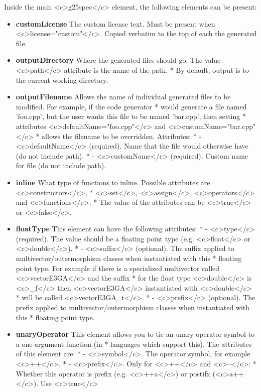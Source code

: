 \documentclass[10pt, a4paper]{article}
\begin{document}
  
Inside the main <c>g25spec</c> element, the following elements can be present:
\begin{itemize}
\item {\bf customLicense} The custom license text. Must be present when <c>license="custom"</c>. Copied verbatim to the top of each the generated file.
\item {\bf outputDirectory} Where the generated files should go. The value <c>path</c> attribute is the name of the path.
 *      By default, output is to the current working directory.
\item {\bf outputFilename} Allows the name of individual generated files to be modified. For example, if the code generator 
 *      would generate a file named 'foo.cpp', but the user wants this file to be named 'bar.cpp', then setting 
 *      attributes <c>defaultName="foo.cpp"</c> and <c>customName="bar.cpp"</c>
 *      allows the filename to be overridden. Attributes:
 *        - <c>defaultName</c> (required). Name that the file would otherwise have (do not include path).
 *        - <c>customName</c> (required). Custom name for file (do not include path).
\item {\bf inline} What type of functions to inline. Possible attributes are <c>constructors</c>, 
 *     <c>set</c>, <c>assign</c>, <c>operators</c> and <c>functions</c>.
 *     The value of the attributes can be <c>true</c> or <c>false</c>.
\item {\bf floatType} This element can have the following attributes:
 *        - <c>type</c> (required). The value should be a floating point type (e.g. <c>float</c> or <c>double</c>).
 *        - <c>suffix</c> (optional). The suffix applied to multivector/outermorphism classes when instantiated with this
 *           floating point type. For example if there is a specialized multivector called <c>vectorE3GA</c> and the suffix
 *           for the float type <c>double</c> is <c>_f</c> then <c>vectorE3GA</c> instantiated with <c>double</c>
 *           will be called <c>vectorE3GA_t</c>.
 *        - <c>prefix</c> (optional). The prefix applied to multivector/outermorphism classes when instantiated with this
 *           floating point type.
\item {\bf unaryOperator} This element allows you to tie an unary operator symbol to a one-argument function (in
 *     languages which support this). The attributes of this element are:
 *        - <c>symbol</c>. The operator symbol, for example <c>++</c>.
 *        - <c>prefix</c>. Only for <c>++</c> and <c>--</c>:
 *           Whether this operator is prefix (e.g. <c>++a</c>) or postifx (<c>a++</c>). Use <c>true</c>

\end{itemize}
\end{document}
